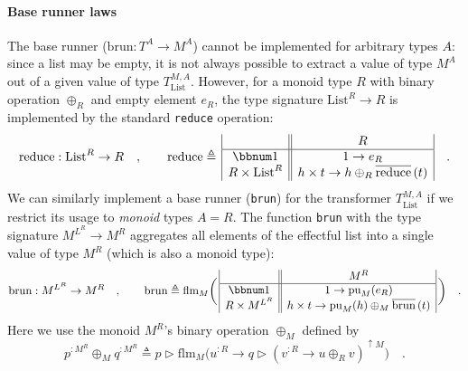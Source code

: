 \paragraph{Base runner laws}

The base runner ($\text{brun}:T^{A}\rightarrow M^{A}$) cannot be
implemented for arbitrary types $A$: since a list may be empty, it
is not always possible to extract a value of type $M^{A}$ out of
a given value of type $T_{\text{List}}^{M,A}$. However, for a monoid
type $R$ with binary operation $\oplus_{R}$ and empty element $e_{R}$,
the type signature $\text{List}^{R}\rightarrow R$ is implemented
by the standard \lstinline!reduce! operation: 
\[
\text{reduce}:\text{List}^{R}\rightarrow R\quad,\quad\quad\text{reduce}\triangleq\,\begin{array}{|c||c|}
 & R\\
\hline \bbnum 1 & 1\rightarrow e_{R}\\
R\times\text{List}^{R} & h\times t\rightarrow h\oplus_{R}\overline{\text{reduce}}\,(t)
\end{array}\quad.
\]
We can similarly implement a base runner (\lstinline!brun!) for the
transformer $T_{\text{List}}^{M,A}$ if we restrict its usage to \emph{monoid}
types $A=R$. The function \lstinline!brun! with the type signature
$M^{L^{R}}\rightarrow M^{R}$ aggregates all elements of the effectful
list into a single value of type $M^{R}$ (which is also a monoid
type):
\[
\text{brun}:M^{L^{R}}\rightarrow M^{R}\quad,\quad\quad\text{brun}\triangleq\text{flm}_{M}\bigg(\,\begin{array}{|c||c|}
 & M^{R}\\
\hline \bbnum 1 & 1\rightarrow\text{pu}_{M}(e_{R})\\
R\times M^{L^{R}} & h\times t\rightarrow\text{pu}_{M}(h)\oplus_{M}\overline{\text{brun}}\,(t)
\end{array}\,\bigg)\quad.
\]
Here we use the monoid $M^{R}$\textsf{'}s binary operation $\oplus_{M}$ defined
by
\begin{equation}
p^{:M^{R}}\oplus_{M}q^{:M^{R}}\triangleq p\triangleright\text{flm}_{M}\big(u^{:R}\rightarrow q\triangleright(v^{:R}\rightarrow u\oplus_{R}v)^{\uparrow M}\big)\quad.\label{eq:definition-of-oplus-M-monad-monoid-1}
\end{equation}


